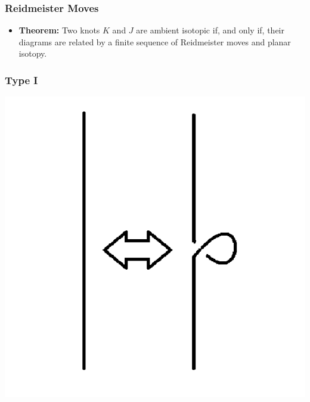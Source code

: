 \documentclass{beamer}
\begin{document}
\begin{frame}
\begin{columns}
\begin{column}{.5\textwidth}
\begin{center}
      \end{center}
    \end{column}
  \end{columns}
\end{frame}

\begin{frame}
  \frametitle{Reidmeister Moves}
  \begin{itemize}
  \item \textbf{Theorem:} Two knots $K$ and $J$ are ambient isotopic if, and
    only if, their diagrams are related by a finite sequence of Reidmeister moves
    and planar isotopy.
  \end{itemize}
\end{frame}

\begin{frame}
  \frametitle{Type I}
  \begin{center}
    \includegraphics[scale=.4]{t1}
  \end{center}
\end{frame}
\end{document}
